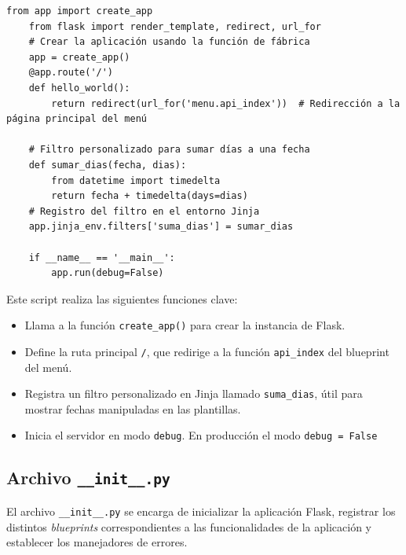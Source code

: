 \documentclass[10pt]{book}
\begin{document}
    \begin{lstlisting}[style=pythonclean, caption={Script principal \texttt{run.py}}]
    from app import create_app
    from flask import render_template, redirect, url_for
    # Crear la aplicación usando la función de fábrica
    app = create_app()
    @app.route('/')
    def hello_world():
        return redirect(url_for('menu.api_index'))  # Redirección a la página principal del menú

    # Filtro personalizado para sumar días a una fecha
    def sumar_dias(fecha, dias):
        from datetime import timedelta
        return fecha + timedelta(days=dias)
    # Registro del filtro en el entorno Jinja
    app.jinja_env.filters['suma_dias'] = sumar_dias

    if __name__ == '__main__':
        app.run(debug=False)
    \end{lstlisting}
    
    Este script realiza las siguientes funciones clave:
    
    \begin{itemize}
      \item Llama a la función \texttt{create\_app()} para crear la instancia de Flask.
      \item Define la ruta principal \texttt{/}, que redirige a la función \texttt{api\_index} del blueprint del menú.
      \item Registra un filtro personalizado en Jinja llamado \texttt{suma\_dias}, útil para mostrar fechas manipuladas en las plantillas.
      \item Inicia el servidor en modo \texttt{debug}. En producción el modo \texttt{debug = False} 
    \end{itemize}
    
\subsection{Archivo \texttt{\_\_init\_\_.py}}
    
    El archivo \texttt{\_\_init\_\_.py} se encarga de inicializar la aplicación Flask, registrar los distintos \textit{blueprints} correspondientes a las funcionalidades de la aplicación y establecer los manejadores de errores.
    
\end{document}
